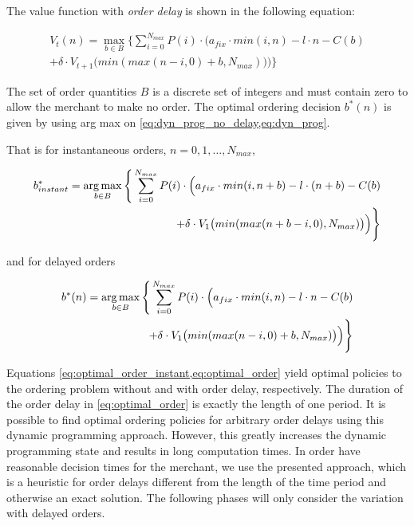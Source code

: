 The value function with \textit{order delay} is shown in the following equation:

\begin{equation}
\begin{split}
V_t(n) = \max_{b \in B} \Bigg\{
	\sum_{i = 0}^{N_{max}} 
		P(i) \cdot \Big(
			a_{fix} \cdot min(i, n) %
			- l \cdot n %
			- C(b) %
		 \\
		+ \delta \cdot V_{t+1}\big(min(max(n - i, 0) + b, N_{max})\big)
	\Big)\Bigg\}
\end{split}
\label{eq:dyn_prog}
\end{equation}

The set of order quantities $B$ is a discrete set of integers and must contain zero to allow the merchant to make no order.
The optimal ordering decision $b^*(n)$ is given by using arg max on \cref{eq:dyn_prog_no_delay,eq:dyn_prog}.

That is for instantaneous orders, $n=0,1,\ldots,N_{max}$,

\begin{equation}
\begin{split}
b^*_{instant} = \argmax_{b \in B} \Bigg\{
\sum_{i = 0}^{N_{max}}
P(i) \cdot \Big(
a_{fix} \cdot min(i, n + b) %
- l \cdot (n + b) %
- C(b) %
\\
+ \delta \cdot V_{1}\big(min(max(n + b - i, 0), N_{max})\big)
\Big)\Bigg\}
\end{split}
\label{eq:optimal_order_instant}
\end{equation}

and for delayed orders

\begin{equation}
\begin{split}
b^*(n) = \argmax_{b \in B} \Bigg\{
\sum_{i = 0}^{N_{max}} 
P(i) \cdot \Big(
a_{fix} \cdot min(i, n) %
- l \cdot n %
- C(b) %
 \\
+ \delta \cdot V_{1}\big(min(max(n - i, 0) + b, N_{max})\big)
\Big)\Bigg\}
\end{split}
\label{eq:optimal_order}
\end{equation}

Equations \cref{eq:optimal_order_instant,eq:optimal_order} yield optimal policies to the ordering problem without and with order delay, respectively.
The duration of the order delay in \cref{eq:optimal_order} is exactly the length of one period.
It is possible to find optimal ordering policies for arbitrary order delays using this dynamic programming approach.
However, this greatly increases the dynamic programming state and results in long computation times.
In order have reasonable decision times for the merchant, we use the presented approach, which is a heuristic for order delays different from the length of the time period and otherwise an exact solution.
The following phases will only consider the variation with delayed orders.

